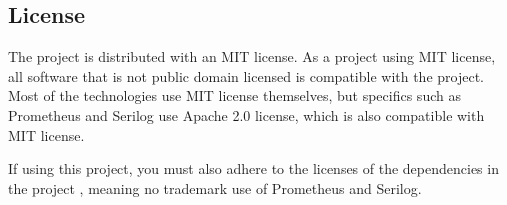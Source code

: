 \subsection{License}
The project is distributed with an MIT license.
As a project using MIT license, all software that is not public domain licensed is compatible with the project. Most of the technologies use MIT license themselves, but specifics such as Prometheus and Serilog use Apache 2.0 license, which is also compatible with MIT license.

If using this project, you must also adhere to the licenses of the dependencies in the project , meaning no trademark use of Prometheus and Serilog.